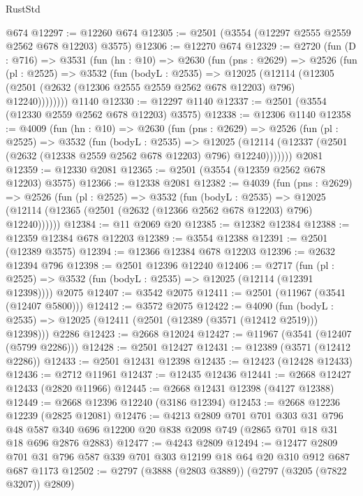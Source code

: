 \begin{lexlean}{RustStd}
\begin{coremodule}
    @674
@12297 := @12260 @674
@12305 := @2501 (@3554 (@12297 @2555 @2559 @2562 @678 @12203) @3575)
@12306 := @12270 @674
@12329 := @2720
    (fun (D : @716) =>
    @3531
      (fun (hn : @10) =>
      @2630
        (fun (pns : @2629) =>
        @2526
          (fun (pl : @2525) =>
          @3532
            (fun (bodyL : @2535) =>
            @12025
              (@12114
                (@12305 (@2501 (@2632 (@12306 @2555 @2559 @2562 @678 @12203) @796) @12240))))))))
    @1140
@12330 := @12297 @1140
@12337 := @2501 (@3554 (@12330 @2559 @2562 @678 @12203) @3575)
@12338 := @12306 @1140
@12358 := @4009
    (fun (hn : @10) =>
    @2630
      (fun (pns : @2629) =>
      @2526
        (fun (pl : @2525) =>
        @3532
          (fun (bodyL : @2535) =>
          @12025 (@12114 (@12337 (@2501 (@2632 (@12338 @2559 @2562 @678 @12203) @796) @12240)))))))
    @2081
@12359 := @12330 @2081
@12365 := @2501 (@3554 (@12359 @2562 @678 @12203) @3575)
@12366 := @12338 @2081
@12382 := @4039
    (fun (pns : @2629) =>
    @2526
      (fun (pl : @2525) =>
      @3532
        (fun (bodyL : @2535) =>
        @12025 (@12114 (@12365 (@2501 (@2632 (@12366 @2562 @678 @12203) @796) @12240))))))
@12384 := @11 @2069 @20
@12385 := @12382 @12384
@12388 := @12359 @12384 @678 @12203
@12389 := @3554 @12388
@12391 := @2501 (@12389 @3575)
@12394 := @12366 @12384 @678 @12203
@12396 := @2632 @12394 @796
@12398 := @2501 @12396 @12240
@12406 := @2717
    (fun (pl : @2525) => @3532 (fun (bodyL : @2535) => @12025 (@12114 (@12391 @12398))))
    @2075
@12407 := @3542 @2075
@12411 := @2501 (@11967 (@3541 (@12407 @5800)))
@12412 := @3572 @2075
@12422 := @4090
    (fun (bodyL : @2535) => @12025 (@12411 (@2501 (@12389 (@3571 (@12412 @2519))) @12398)))
    @2286
@12423 := @2668 @12024
@12427 := @11967 (@3541 (@12407 (@5799 @2286)))
@12428 := @2501 @12427
@12431 := @12389 (@3571 (@12412 @2286))
@12433 := @2501 @12431 @12398
@12435 := @12423 (@12428 @12433)
@12436 := @2712 @11961
@12437 := @12435 @12436
@12441 := @2668 @12427 @12433 (@2820 @11966)
@12445 := @2668 @12431 @12398 (@4127 @12388)
@12449 := @2668 @12396 @12240 (@3186 @12394)
@12453 := @2668 @12236 @12239 (@2825 @12081)
@12476 := @4213
    @2809
    @701
    @701
    @303
    @31
    @796
    @48
    @587
    @340
    @696
    @12200
    @20
    @838
    @2098
    @749
    (@2865 @701 @18 @31 @18 @696 @2876 @2883)
@12477 := @4243 @2809
@12494 := @12477
    @2809
    @701
    @31
    @796
    @587
    @339
    @701
    @303
    @12199
    @18
    @64
    @20
    @310
    @912
    @687
    @687
    @1173
@12502 := @2797 (@3888 (@2803 @3889)) (@2797 (@3205 (@7822 @3207)) @2809)

\end{coremodule}
\end{lexlean}

